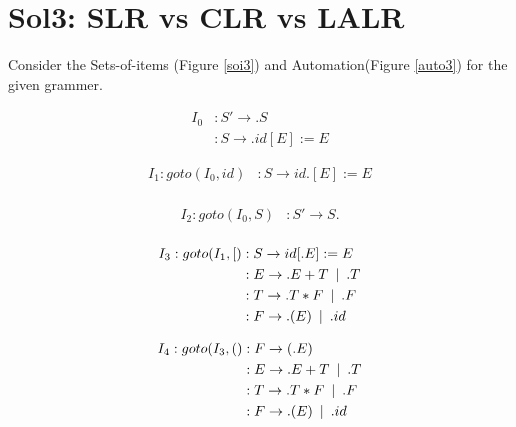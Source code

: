 \documentclass{article}
\newcommand\tab[1][5pt]{\hspace*{#1}}
\newcommand\sep{\tab | \tab }
\begin{document}
\section*{Sol3: SLR vs CLR vs LALR}
Consider the Sets-of-items (Figure \ref{soi3}) and Automation(Figure \ref{auto3}) for the given grammer.
\begin{figure}[h!]
\begin{multicols}{2}
\begin{equation*}
\begin{aligned}
I_0 &: S' \rightarrow .S  \\
&: S \rightarrow .id[E] := E
\end{aligned}
\end{equation*}

\begin{equation*}
\begin{aligned}
I_1 : goto(I_0,id) &: S \rightarrow id.[E] :=E  \\
\end{aligned}
\end{equation*}

\begin{equation*}
\begin{aligned}
I_2 : goto(I_0,S) &: S' \rightarrow S.  \\
\end{aligned}
\end{equation*}

\begin{equation*}
\begin{aligned}
I_3 : goto(I_1,[) &: S \rightarrow id[.E] :=E  \\
&: E \rightarrow .E+T \tab | \tab .T \\
&: T \rightarrow .T*F \tab | \tab  .F \\
&: F \rightarrow .(E) \sep .id \\
\end{aligned}
\end{equation*}

\begin{equation*}
\begin{aligned}
I_4 : goto(I_3,() &: F \rightarrow (.E)  \\
&: E \rightarrow .E+T \tab | \tab .T \\
&: T \rightarrow .T*F \tab | \tab  .F \\
&: F \rightarrow .(E) \sep .id \\
\end{aligned}
\end{equation*}


\end{multicols}
\end{figure}
\end{document}
